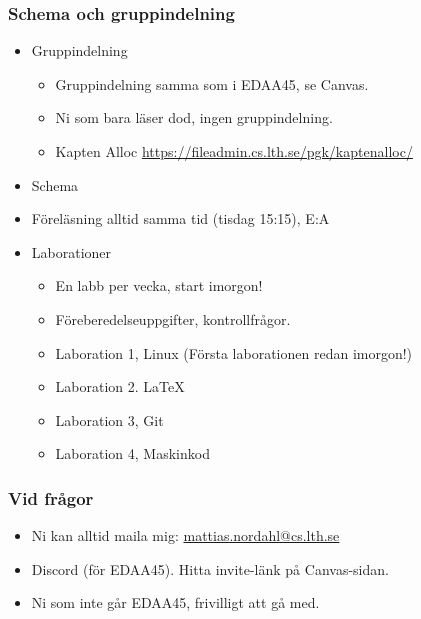 \begin{frame}[fragile=singleslide]
	\frametitle{Schema och gruppindelning}

	\begin{itemize}
		\item Gruppindelning
		      \begin{itemize}
			      \item Gruppindelning samma som i EDAA45, se Canvas.
			      \item Ni som bara läser dod, ingen gruppindelning.
			      \item Kapten Alloc \url{https://fileadmin.cs.lth.se/pgk/kaptenalloc/}
		      \end{itemize}
		\item Schema
		\item Föreläsning alltid samma tid (tisdag 15:15), E:A
		\item Laborationer
		      \begin{itemize}
			      \item En labb per vecka, start imorgon!
			      \item Föreberedelseuppgifter, kontrollfrågor.
			      \item Laboration 1, Linux (Första laborationen redan imorgon!)
			      \item Laboration 2. \LaTeX
			      \item Laboration 3, Git
			      \item Laboration 4, Maskinkod
		      \end{itemize}
	\end{itemize}
\end{frame}



\begin{frame}[fragile=singleslide]
	\frametitle{Vid frågor}

	\begin{itemize}
		\item Ni kan alltid maila mig: \url{mattias.nordahl@cs.lth.se}
		\item Discord (för EDAA45). Hitta invite-länk på Canvas-sidan.
		\item Ni som inte går EDAA45, frivilligt att gå med.
	\end{itemize}
\end{frame}